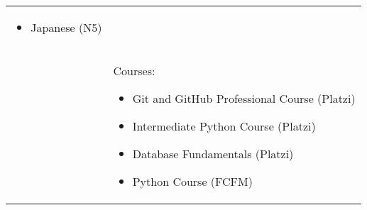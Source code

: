 \documentclass[twoside,letter,openright,10pt]{report}
\begin{document}
\begin{table}[hbt!]
\begin{tabular}{p{40mm}p{140mm}}
\begin{itemize}[noitemsep,nolistsep]
\item Japanese (N5)
\vspace{-4mm}
\end{itemize}
\\
& Courses:
\begin{itemize}[noitemsep,nolistsep]
\item Git and GitHub Professional Course (Platzi)
\item Intermediate Python Course (Platzi)
\item Database Fundamentals (Platzi)
\item Python Course (FCFM)
\vspace{-4mm}
\end{itemize}
\end{tabular}
\end{table}
\end{document}
